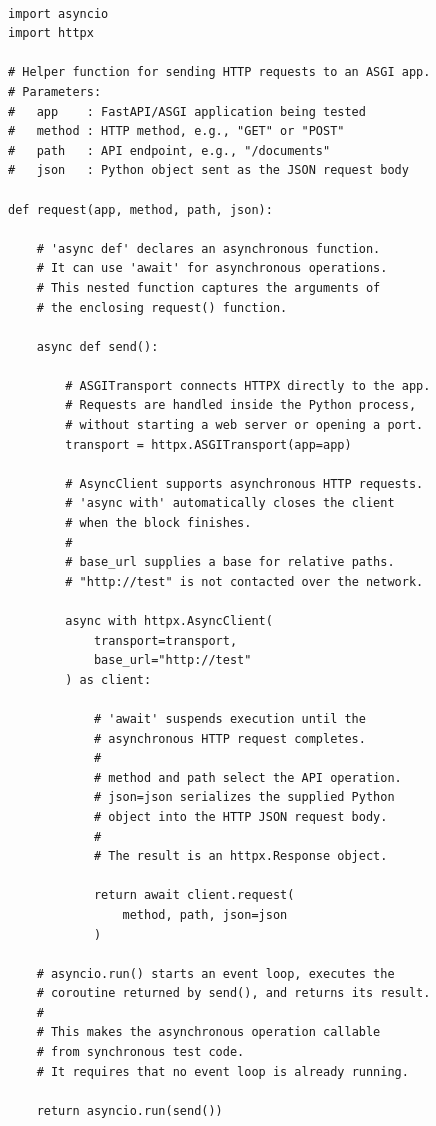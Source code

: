 \begin{lstlisting}[style=pythonlearning,
caption={Testing AgentSouriva's HTTP API in-process},
label={lst:api-test}]

import asyncio
import httpx

# Helper function for sending HTTP requests to an ASGI app.
# Parameters:
#   app    : FastAPI/ASGI application being tested
#   method : HTTP method, e.g., "GET" or "POST"
#   path   : API endpoint, e.g., "/documents"
#   json   : Python object sent as the JSON request body

def request(app, method, path, json):

    # 'async def' declares an asynchronous function.
    # It can use 'await' for asynchronous operations.
    # This nested function captures the arguments of
    # the enclosing request() function.

    async def send():

        # ASGITransport connects HTTPX directly to the app.
        # Requests are handled inside the Python process,
        # without starting a web server or opening a port.
        transport = httpx.ASGITransport(app=app)

        # AsyncClient supports asynchronous HTTP requests.
        # 'async with' automatically closes the client
        # when the block finishes.
        #
        # base_url supplies a base for relative paths.
        # "http://test" is not contacted over the network.

        async with httpx.AsyncClient(
            transport=transport,
            base_url="http://test"
        ) as client:

            # 'await' suspends execution until the
            # asynchronous HTTP request completes.
            #
            # method and path select the API operation.
            # json=json serializes the supplied Python
            # object into the HTTP JSON request body.
            #
            # The result is an httpx.Response object.

            return await client.request(
                method, path, json=json
            )

    # asyncio.run() starts an event loop, executes the
    # coroutine returned by send(), and returns its result.
    #
    # This makes the asynchronous operation callable
    # from synchronous test code.
    # It requires that no event loop is already running.

    return asyncio.run(send())



\end{lstlisting}

